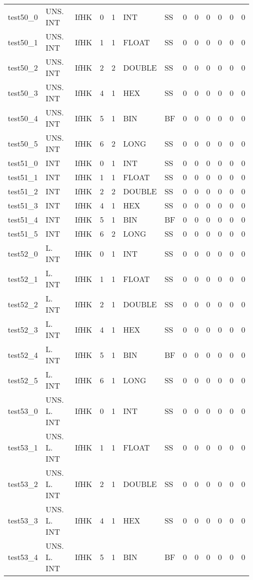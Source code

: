 \begin{longtable}{|l|l|l|p{0.5cm}|p{0.5cm}|l|p{0.5cm}|p{0.5cm}|p{0.5cm}|l|l|p{0.5cm}|l|}
test50\_0 & UNS. INT & IfHK & 0 & 1 & INT & SS & 0 & 0 & 0 & 0 & 0 & 0 \\
test50\_1 & UNS. INT & IfHK & 1 & 1 & FLOAT & SS & 0 & 0 & 0 & 0 & 0 & 0 \\
test50\_2 & UNS. INT & IfHK & 2 & 2 & DOUBLE & SS & 0 & 0 & 0 & 0 & 0 & 0 \\
test50\_3 & UNS. INT & IfHK & 4 & 1 & HEX & SS & 0 & 0 & 0 & 0 & 0 & 0 \\
test50\_4 & UNS. INT & IfHK & 5 & 1 & BIN & BF & 0 & 0 & 0 & 0 & 0 & 0 \\
test50\_5 & UNS. INT & IfHK & 6 & 2 & LONG & SS & 0 & 0 & 0 & 0 & 0 & 0 \\
test51\_0 & INT & IfHK & 0 & 1 & INT & SS & 0 & 0 & 0 & 0 & 0 & 0 \\
test51\_1 & INT & IfHK & 1 & 1 & FLOAT & SS & 0 & 0 & 0 & 0 & 0 & 0 \\
test51\_2 & INT & IfHK & 2 & 2 & DOUBLE & SS & 0 & 0 & 0 & 0 & 0 & 0 \\
test51\_3 & INT & IfHK & 4 & 1 & HEX & SS & 0 & 0 & 0 & 0 & 0 & 0 \\
test51\_4 & INT & IfHK & 5 & 1 & BIN & BF & 0 & 0 & 0 & 0 & 0 & 0 \\
test51\_5 & INT & IfHK & 6 & 2 & LONG & SS & 0 & 0 & 0 & 0 & 0 & 0 \\
test52\_0 & L. INT & IfHK & 0 & 1 & INT & SS & 0 & 0 & 0 & 0 & 0 & 0 \\
test52\_1 & L. INT & IfHK & 1 & 1 & FLOAT & SS & 0 & 0 & 0 & 0 & 0 & 0 \\
test52\_2 & L. INT & IfHK & 2 & 1 & DOUBLE & SS & 0 & 0 & 0 & 0 & 0 & 0 \\
test52\_3 & L. INT & IfHK & 4 & 1 & HEX & SS & 0 & 0 & 0 & 0 & 0 & 0 \\
test52\_4 & L. INT & IfHK & 5 & 1 & BIN & BF & 0 & 0 & 0 & 0 & 0 & 0 \\
test52\_5 & L. INT & IfHK & 6 & 1 & LONG & SS & 0 & 0 & 0 & 0 & 0 & 0 \\
test53\_0 & UNS. L. INT & IfHK & 0 & 1 & INT & SS & 0 & 0 & 0 & 0 & 0 & 0 \\
test53\_1 & UNS. L. INT & IfHK & 1 & 1 & FLOAT & SS & 0 & 0 & 0 & 0 & 0 & 0 \\
test53\_2 & UNS. L. INT & IfHK & 2 & 1 & DOUBLE & SS & 0 & 0 & 0 & 0 & 0 & 0 \\
test53\_3 & UNS. L. INT & IfHK & 4 & 1 & HEX & SS & 0 & 0 & 0 & 0 & 0 & 0 \\
test53\_4 & UNS. L. INT & IfHK & 5 & 1 & BIN & BF & 0 & 0 & 0 & 0 & 0 & 0 \\

\end{longtable}
